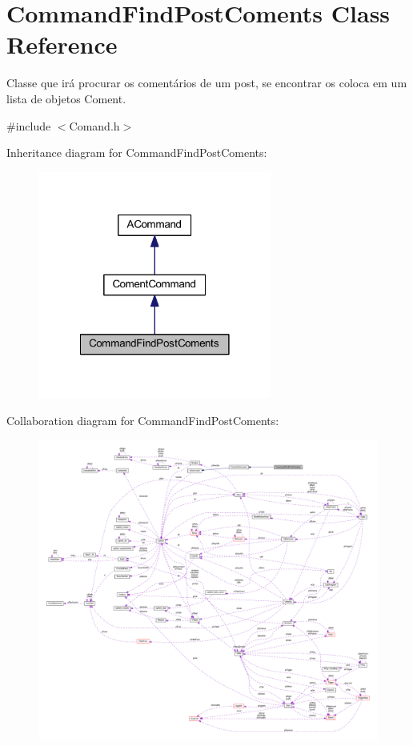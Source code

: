 \hypertarget{class_command_find_post_coments}{\section{Command\-Find\-Post\-Coments Class Reference}
\label{class_command_find_post_coments}
}


Classe que irá procurar os comentários de um post, se encontrar os coloca em um lista de objetos Coment.  




{\ttfamily \#include $<$Comand.\-h$>$}



Inheritance diagram for Command\-Find\-Post\-Coments\-:\nopagebreak
\begin{figure}[H]
\begin{center}
\leavevmode
\includegraphics[width=218pt]{class_command_find_post_coments__inherit__graph}
\end{center}
\end{figure}


Collaboration diagram for Command\-Find\-Post\-Coments\-:\nopagebreak
\begin{figure}[H]
\begin{center}
\leavevmode
\includegraphics[width=350pt]{class_command_find_post_coments__coll__graph}
\end{center}
\end{figure}
